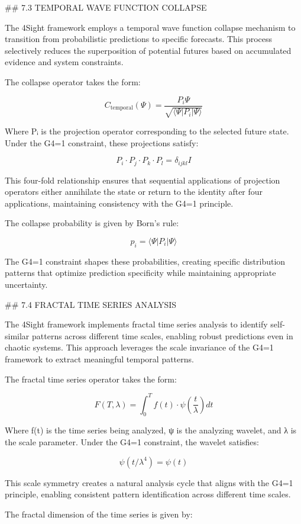 ## 7.3 TEMPORAL WAVE FUNCTION COLLAPSE

The 4Sight framework employs a temporal wave function collapse mechanism to transition from probabilistic predictions to specific forecasts. This process selectively reduces the superposition of potential futures based on accumulated evidence and system constraints.

The collapse operator takes the form:

$$C_{\text{temporal}}(\Psi) = \frac{P_i \Psi}{\sqrt{\langle \Psi | P_i | \Psi \rangle}}$$

Where Pᵢ is the projection operator corresponding to the selected future state. Under the G4=1 constraint, these projections satisfy:

$$P_i \cdot P_j \cdot P_k \cdot P_l = \delta_{ijkl} I$$

This four-fold relationship ensures that sequential applications of projection operators either annihilate the state or return to the identity after four applications, maintaining consistency with the G4=1 principle.

The collapse probability is given by Born's rule:

$$p_i = \langle \Psi | P_i | \Psi \rangle$$

The G4=1 constraint shapes these probabilities, creating specific distribution patterns that optimize prediction specificity while maintaining appropriate uncertainty.

## 7.4 FRACTAL TIME SERIES ANALYSIS

The 4Sight framework implements fractal time series analysis to identify self-similar patterns across different time scales, enabling robust predictions even in chaotic systems. This approach leverages the scale invariance of the G4=1 framework to extract meaningful temporal patterns.

The fractal time series operator takes the form:

$$F(T, \lambda) = \int_0^T f(t) \cdot \psi\left(\frac{t}{\lambda}\right) dt$$

Where f(t) is the time series being analyzed, ψ is the analyzing wavelet, and λ is the scale parameter. Under the G4=1 constraint, the wavelet satisfies:

$$\psi(t/\lambda^4) = \psi(t)$$

This scale symmetry creates a natural analysis cycle that aligns with the G4=1 principle, enabling consistent pattern identification across different time scales.

The fractal dimension of the time series is given by:

